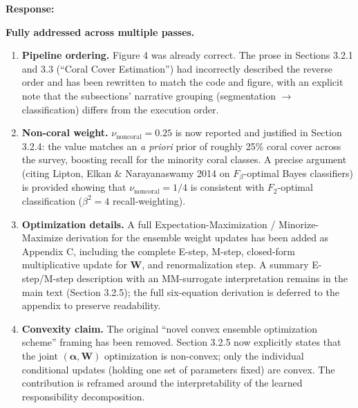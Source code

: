 \documentclass[12pt]{article}
\newenvironment{response}{%
  \vspace{4pt}%
  \color{respblue}%
  \noindent\textbf{Response:}\space
}{%
  \vspace{10pt}%
}
\begin{document}
\begin{response}
\textbf{Fully addressed across multiple passes.}

\begin{enumerate}[topsep=2pt,itemsep=3pt]
  \item \textbf{Pipeline ordering.}  Figure 4 was
    already correct.  The prose in Sections 3.2.1 and 3.3 (``Coral Cover
    Estimation'') had incorrectly described the reverse order and has been
    rewritten to match the code and figure, with an explicit note that the
    subsections' narrative grouping (segmentation $\to$ classification) differs
    from the execution order.

  \item \textbf{Non-coral weight.}  $\nu_{\mathrm{noncoral}} = 0.25$ is now
    reported and justified in Section 3.2.4: the value matches an \emph{a
    priori} prior of roughly 25\% coral cover across the survey, boosting
    recall for the minority coral classes.  A precise argument (citing Lipton,
    Elkan \& Narayanaswamy 2014 on $F_\beta$-optimal Bayes classifiers) is
    provided showing that $\nu_{\mathrm{noncoral}} = 1/4$ is consistent with
    $F_2$-optimal classification ($\beta^2 = 4$ recall-weighting).

  \item \textbf{Optimization details.}  A full Expectation-Maximization /
    Minorize-Maximize derivation for the ensemble weight updates has been added
    as Appendix C, including the complete E-step, M-step, closed-form
    multiplicative update for $\mathbf{W}$, and renormalization step.  A
    summary E-step/M-step description with an MM-surrogate interpretation
    remains in the main text (Section 3.2.5); the full six-equation derivation
    is deferred to the appendix to preserve readability.

  \item \textbf{Convexity claim.}  The original ``novel convex ensemble
    optimization scheme'' framing has been removed.  Section 3.2.5 now
    explicitly states that the joint $(\boldsymbol\alpha, \mathbf{W})$
    optimization is non-convex; only the individual conditional updates
    (holding one set of parameters fixed) are convex.  The contribution is
    reframed around the interpretability of the learned responsibility
    decomposition.
\end{enumerate}
\end{response}

\end{document}
